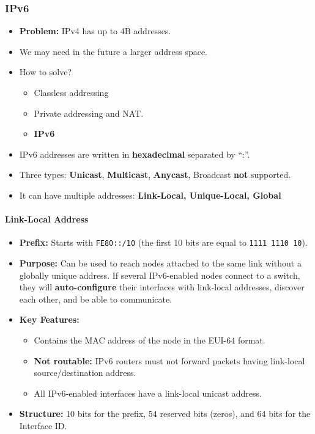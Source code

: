 \documentclass[a4paper, 12pt]{book} %
\begin{document}
\subsubsection{IPv6}\label{ipv6}

\begin{itemize}
\tightlist
\item
  \textbf{Problem:} IPv4 has up to 4B addresses.
\item
  We may need in the future a larger address space.
\item
  How to solve?

  \begin{itemize}
  \tightlist
  \item
    Classless addressing
  \item
    Private addressing and NAT.
  \item
    \textbf{IPv6}
  \end{itemize}
\item
  IPv6 addresses are written in \textbf{hexadecimal} separated by ``:''.
\item
  Three types: \textbf{Unicast}, \textbf{Multicast}, \textbf{Anycast},
  Broadcast \textbf{not} supported.
\item
  It can have multiple addresses: \textbf{Link-Local, Unique-Local,
  Global}
\end{itemize}

\paragraph{Link-Local Address}\label{link-local-address}

\begin{itemize}
\tightlist
\item
  \textbf{Prefix:} Starts with \texttt{FE80::/10} (the first 10 bits are
  equal to \texttt{1111\ 1110\ 10}).
\item
  \textbf{Purpose:} Can be used to reach nodes attached to the same link
  without a globally unique address. If several IPv6-enabled nodes
  connect to a switch, they will \textbf{auto-configure} their
  interfaces with link-local addresses, discover each other, and be able
  to communicate.
\item
  \textbf{Key Features:}

  \begin{itemize}
  \tightlist
  \item
    Contains the MAC address of the node in the EUI-64 format.
  \item
    \textbf{Not routable:} IPv6 routers must not forward packets having
    link-local source/destination address.
  \item
    All IPv6-enabled interfaces have a link-local unicast address.
  \end{itemize}
\item
  \textbf{Structure:} 10 bits for the prefix, 54 reserved bits (zeros),
  and 64 bits for the Interface ID.
\end{itemize}
\end{document}

